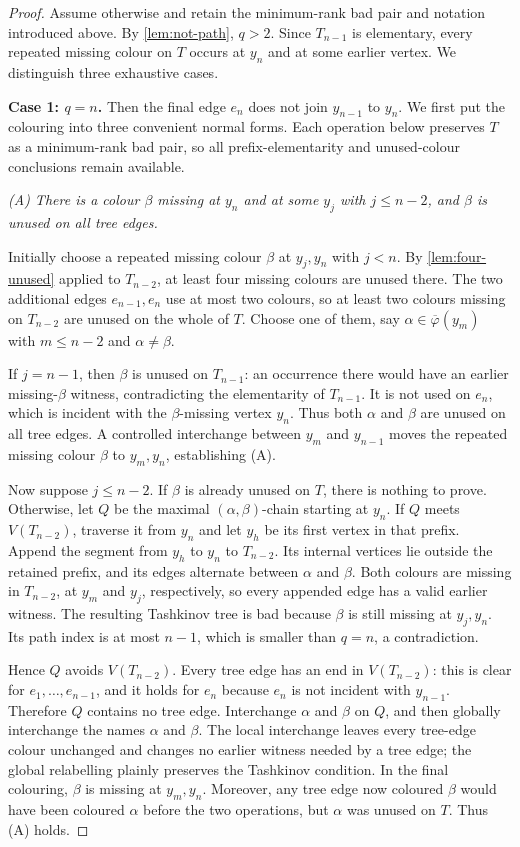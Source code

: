 \documentclass[11pt]{article}
\theoremstyle{definition}
\newcommand{\missing}[1]{\overline{#1}}
\begin{document}
\begin{proof}
Assume otherwise and retain the minimum-rank bad pair and notation introduced
above.  By \cref{lem:not-path}, $q>2$.  Since $T_{n-1}$ is elementary, every
repeated missing colour on $T$ occurs at $y_n$ and at some earlier vertex.
We distinguish three exhaustive cases.

\medskip
\noindent\textbf{Case 1: $q=n$.}
Then the final edge $e_n$ does not join $y_{n-1}$ to $y_n$.  We first put the
colouring into three convenient normal forms.  Each operation below preserves
$T$ as a minimum-rank bad pair, so all prefix-elementarity and unused-colour
conclusions remain available.

\smallskip
\emph{(A) There is a colour $\beta$ missing at $y_n$ and at some
$y_j$ with $j\le n-2$, and $\beta$ is unused on all tree edges.}

Initially choose a repeated missing colour $\beta$ at $y_j,y_n$ with $j<n$.
By \cref{lem:four-unused} applied to $T_{n-2}$, at least four missing colours
are unused there.  The two additional edges $e_{n-1},e_n$ use at most two
colours, so at least two colours missing on $T_{n-2}$ are unused on the whole
of $T$.  Choose one of them, say
$\alpha\in\missing\varphi(y_m)$ with $m\le n-2$ and $\alpha\ne\beta$.

If $j=n-1$, then $\beta$ is unused on $T_{n-1}$: an occurrence there would
have an earlier missing-$\beta$ witness, contradicting the elementarity of
$T_{n-1}$.  It is not used on $e_n$, which is incident with the
$\beta$-missing vertex $y_n$.  Thus both $\alpha$ and $\beta$ are unused on
all tree edges.  A controlled interchange between $y_m$ and $y_{n-1}$ moves
the repeated missing colour $\beta$ to $y_m,y_n$, establishing (A).

Now suppose $j\le n-2$.  If $\beta$ is already unused on $T$, there is nothing
to prove.  Otherwise, let $Q$ be the maximal $(\alpha,\beta)$-chain starting
at $y_n$.  If $Q$ meets $V(T_{n-2})$, traverse it from $y_n$ and let $y_h$ be
its first vertex in that prefix.  Append the segment from $y_h$ to $y_n$ to
$T_{n-2}$.  Its internal vertices lie outside the retained prefix, and its
edges alternate between $\alpha$ and $\beta$.  Both colours are missing in
$T_{n-2}$, at $y_m$ and $y_j$, respectively, so every appended edge has a
valid earlier witness.  The resulting Tashkinov tree is bad because
$\beta$ is still missing at $y_j,y_n$.  Its path index is at most $n-1$, which
is smaller than $q=n$, a contradiction.

Hence $Q$ avoids $V(T_{n-2})$.  Every tree edge has an end in
$V(T_{n-2})$: this is clear for $e_1,\ldots,e_{n-1}$, and it holds for $e_n$
because $e_n$ is not incident with $y_{n-1}$.  Therefore $Q$ contains no tree
edge.  Interchange $\alpha$ and $\beta$ on $Q$, and then globally interchange
the names $\alpha$ and $\beta$.  The local interchange leaves every tree-edge
colour unchanged and changes no earlier witness needed by a tree edge; the
global relabelling plainly preserves the Tashkinov condition.  In the final
colouring, $\beta$ is missing at $y_m,y_n$.  Moreover, any tree edge now
coloured $\beta$ would have been coloured $\alpha$ before the two operations,
but $\alpha$ was unused on $T$.  Thus (A) holds.


\end{proof}
\end{document}
